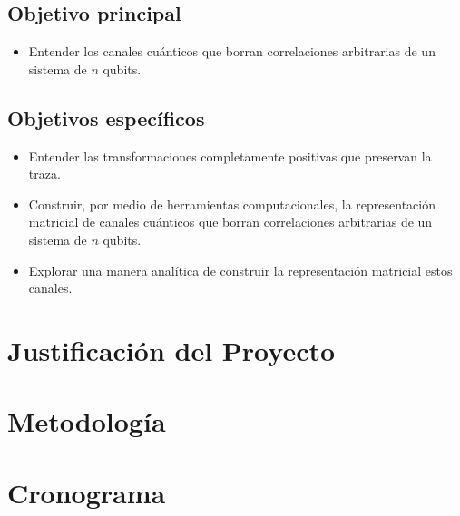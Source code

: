 \documentclass[11pt, spanish, letterpage]{article}
\begin{document}
\subsection{Objetivo principal}
\begin{itemize}
	\item Entender los canales cuánticos que borran correlaciones arbitrarias de un sistema de $n$ qubits. 	
\end{itemize}

\subsection{Objetivos específicos}
\begin{itemize}
	\item Entender las transformaciones completamente positivas que preservan la traza. 
	\item Construir, por medio de herramientas computacionales, la representación matricial de canales cuánticos que borran correlaciones arbitrarias de un sistema de $n$ qubits. 
	\item Explorar una manera analítica de construir la representación matricial estos canales.
\end{itemize}

\section{Justificación del Proyecto}


\section{Metodología}


\section{Cronograma}
\end{document}
